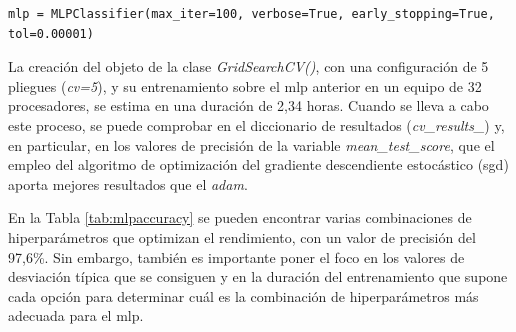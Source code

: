 \vspace{3mm}

\begin{lstlisting}[style=Python, caption={Clasificador MLP por defecto}]
  mlp = MLPClassifier(max_iter=100, verbose=True, early_stopping=True, tol=0.00001)
\end{lstlisting}

\vspace{3mm}

La creación del objeto de la clase \textit{GridSearchCV()}, con una configuración de 5 pliegues (\textit{cv=5}), y su entrenamiento sobre el \gls{mlp} anterior en un equipo de 32 procesadores, se estima en una duración de 2,34 horas. Cuando se lleva a cabo este proceso, se puede comprobar en el diccionario de resultados (\textit{cv\_results\_}) y, en particular, en los valores de precisión de la variable \textit{mean\_test\_score}, que el empleo del algoritmo de optimización del gradiente descendiente estocástico (\gls{sgd}) aporta mejores resultados que el \textit{adam}. 

\vspace{3mm}

En la Tabla \ref{tab:mlpaccuracy} se pueden encontrar varias combinaciones de hiperparámetros que optimizan el rendimiento, con un valor de precisión del 97,6\%. Sin embargo, también es importante poner el foco en los valores de desviación típica que se consiguen y en la duración del entrenamiento que supone cada opción para determinar cuál es la combinación de hiperparámetros más adecuada para el \gls{mlp}. 

\vspace{3mm}

